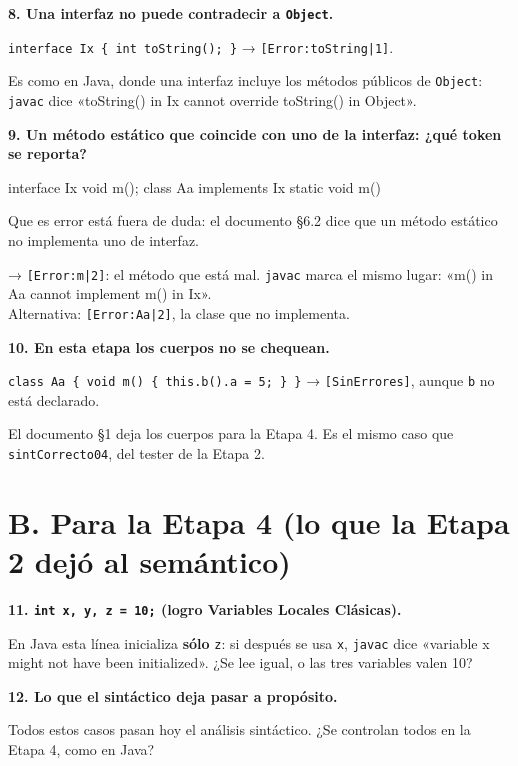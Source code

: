 \documentclass[12pt,a4paper]{article}
\newcommand{\cod}[1]{\texttt{#1}}
\newcommand{\pregunta}[1]{\par\medskip\needspace{4\baselineskip}\noindent\textbf{#1}\par\smallskip}
\begin{document}
\pregunta{8. Una interfaz no puede contradecir a \cod{Object}.}

\cod{interface Ix \{ int toString(); \}} → \cod{[Error:toString|1]}.

Es como en Java, donde una interfaz incluye los métodos públicos de \cod{Object}: \cod{javac} dice
«toString() in Ix cannot override toString() in Object».

\pregunta{9. Un método estático que coincide con uno de la interfaz: ¿qué token se reporta?}

\begin{fuente}
interface Ix { void m(); }
class Aa implements Ix { static void m() { } }
\end{fuente}

Que es error está fuera de duda: el documento §6.2 dice que un método estático no implementa uno
de interfaz.

→ \cod{[Error:m|2]}: el método que está mal. \cod{javac} marca el mismo lugar: «m() in Aa cannot
implement m() in Ix».\\
Alternativa: \cod{[Error:Aa|2]}, la clase que no implementa.

\pregunta{10. En esta etapa los cuerpos no se chequean.}

\cod{class Aa \{ void m() \{ this.b().a = 5; \} \}} → \cod{[SinErrores]}, aunque \cod{b} no está
declarado.

El documento §1 deja los cuerpos para la Etapa 4. Es el mismo caso que \cod{sintCorrecto04}, del
tester de la Etapa 2.

\section*{B. Para la Etapa 4 (lo que la Etapa 2 dejó al semántico)}

\pregunta{11. \cod{int x, y, z = 10;} (logro Variables Locales Clásicas).}

En Java esta línea inicializa \textbf{sólo} \cod{z}: si después se usa \cod{x}, \cod{javac} dice
«variable x might not have been initialized». ¿Se lee igual, o las tres variables valen 10?

\pregunta{12. Lo que el sintáctico deja pasar a propósito.}

Todos estos casos pasan hoy el análisis sintáctico. ¿Se controlan todos en la Etapa 4, como en
Java?
\end{document}
